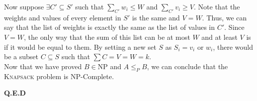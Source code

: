 Now suppose $\exists C' \subseteq S'$ such that $\sum_{C'}w_i\leq W$ and $\sum_{C'}v_i\geq V$. Note that the weights and values of every element in $S'$ is the same and $V=W$. Thus, we can say that
the list of weights is exactly the same as the list of values in $C'$. Since $V=W$, the only way that the sum of this list can be at most $W$ and at least $V$ is if it would be equal to them. By setting
a new set $S$ as $S_i=v_i \text{ or } w_i$, there would be a subset $C \subseteq S$ such that $\sum C=V=W=k$. \\

Now that we have proved $B \in \text{NP}$ and $A \leq_P B$, we can conclude that the \textsc{Knapsack} problem is NP-Complete.

\textbf{Q.E.D}